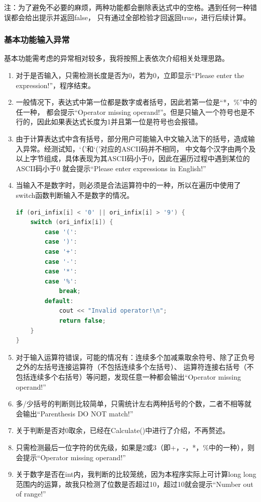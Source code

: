 \documentclass[a4paper, 11pt, UTF8]{ctexart}
\begin{document}
注：为了避免不必要的麻烦，两种功能都会删除表达式中的空格。遇到任何一种错误都会给出提示并返回false，
只有通过全部检验才回返回true，进行后续计算。

\subsubsection{基本功能输入异常}

基本功能需考虑的异常相对较多，我将按照上表依次介绍相关处理思路。

\begin{enumerate}
    \item 对于是否输入，只需检测长度是否为0，若为0，立即显示“Please enter the expression!”，程序结束。
    \item 一般情况下，表达式中第一位都是数字或者括号，因此若第一位是“*，\%”中的任一种，
          都会提示“Operator missing operand!”。但是只输入一个符号也是不行的，因此如果表达式长度为1并且第一位是符号也会报错。
    \item 由于计算表达式中含有括号，部分用户可能输入中文输入法下的括号，造成输入异常。经测试知，‘（’和‘(’对应的ASCII码并不相同，
          中文每个汉字由两个及以上字节组成，具体表现为其ASCII码小于0，因此在遍历过程中遇到某位的ASCII码小于0
          就会提示“Please enter expressions in English!”
    \item 当输入不是数字时，则必须是合法运算符中的一种，所以在遍历中使用了switch函数判断输入不是数字的情况。
          \begin{lstlisting}[language=C++, basicstyle=\ttfamily]
if (ori_infix[i] < '0' || ori_infix[i] > '9') {
    switch (ori_infix[i]) {
        case '(':
        case ')':
        case '+':
        case '-':
        case '*':
        case '%':
            break;
        default:
            cout << "Invalid operator!\n";
            return false;
    }
}
          \end{lstlisting}
    \item 对于输入运算符错误，可能的情况有：连续多个加减乘取余符号、除了正负号之外的左括号连接运算符（不包括连续多个左括号）、
          运算符连接右括号（不包括连续多个右括号）等问题，发现任意一种都会输出“Operator missing operand!”
    \item 多/少括号的判断则比较简单，只需统计左右两种括号的个数，二者不相等就会输出“Parenthesis DO NOT match!”
    \item 关于判断是否对0取余，已经在Calculate()中进行了介绍，不再赘述。
    \item 只需检测最后一位字符的优先级，如果是2或3（即+，-，*，\%中的一种），则会提示“Operator missing operand!”
    \item 关于数字是否在int内，我判断的比较笼统，因为本程序实际上可计算long long范围内的运算，故我只检测了位数是否超过10，超过10就会提示“Number out of range!”
\end{enumerate}
\end{document}
